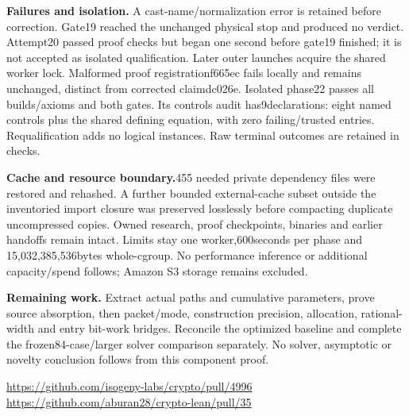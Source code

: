 \documentclass[10pt]{article}
\begin{document}
\textbf{Failures and isolation.} A cast-name/normalization error is retained
before correction. Gate19 reached the unchanged physical stop and produced no
verdict. Attempt20 passed proof checks but began one second before gate19
finished; it is not accepted as isolated qualification. Later outer
launches acquire the shared worker lock. Malformed proof registrationf665ec
fails locally and remains unchanged, distinct from corrected claimdc026e.
Isolated phase22 passes all builds/axioms and both gates. Its controls audit
has9declarations: eight named controls plus the shared defining equation,
with zero failing/trusted entries. Requalification adds no logical instances.
Raw terminal outcomes are retained in checks.

\textbf{Cache and resource boundary.}455 needed private dependency files were
restored and rehashed. A further bounded external-cache subset outside the
inventoried import closure was preserved losslessly before compacting duplicate
uncompressed copies. Owned research, proof checkpoints, binaries and earlier
handoffs remain intact. Limits stay one worker,600seconds per phase and
15,032,385,536bytes whole-cgroup. No performance inference or additional
capacity/spend follows; Amazon S3 storage remains excluded.

\textbf{Remaining work.} Extract actual paths and cumulative parameters, prove
source absorption, then packet/mode, construction precision, allocation,
rational-width and entry bit-work bridges. Reconcile the optimized baseline
and complete the frozen84-case/larger solver comparison separately. No solver,
asymptotic or novelty conclusion follows from this component proof.

\url{https://github.com/isogeny-labs/crypto/pull/4996}\quad
\url{https://github.com/aburan28/crypto-lean/pull/35}
\end{document}
